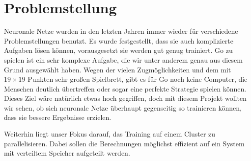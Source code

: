 \section{Problemstellung}
Neuronale Netze wurden in den letzten Jahren immer wieder für verschiedene
Problemstellungen benutzt. Es wurde festgestellt, dass sie auch komplizierte
Aufgaben lösen können, vorausgesetzt sie werden gut genug trainiert. Go zu
spielen ist ein sehr komplexe Aufgabe, die wir unter anderem genau aus diesem
Grund ausgewählt haben. Wegen der vielen Zugmöglichkeiten und dem mit $19
{\times} 19$ Punkten sehr großen Spielbrett, gibt es für Go noch keine
Computer, die Menschen deutlich übertreffen oder sogar eine perfekte Strategie
spielen können. Dieses Ziel wäre natürlich etwas hoch gegriffen, doch mit
diesem Projekt wollten wir sehen, ob sich neuronale Netze überhaupt gegenseitig
so trainieren können, dass sie bessere Ergebnisse erzielen.

Weiterhin liegt unser Fokus darauf, das Training auf einem Cluster zu
parallelisieren. Dabei sollen die Berechnungen möglichst effizient auf ein
System mit verteiltem Speicher aufgeteilt werden.
